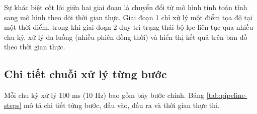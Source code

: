 \begin{table}[H]
\centering
{}
\caption{So sánh hiệu năng giai đoạn 1 và giai đoạn 2}
\label{tab:phase-compare-w5}
\end{table}

Sự khác biệt cốt lõi giữa hai giai đoạn là chuyển đổi từ mô hình tính toán tĩnh sang mô hình theo dõi thời gian thực. Giai đoạn 1 chỉ xử lý một điểm tọa độ tại một thời điểm, trong khi giai đoạn 2 duy trì trạng thái bộ lọc liên tục qua nhiều chu kỳ, xử lý đa luồng (nhiều phiên đồng thời) và hiển thị kết quả trên bản đồ theo thời gian thực.

\subsection{Chi tiết chuỗi xử lý từng bước}

\hspace{0.5cm} Mỗi chu kỳ xử lý 100 ms (10 Hz) bao gồm bảy bước chính. Bảng \ref{tab:pipeline-steps} mô tả chi tiết từng bước, đầu vào, đầu ra và thời gian thực thi.



